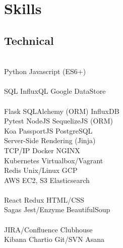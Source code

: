 \documentclass[]{deedy-resume-openfont}
\begin{document}
\begin{minipage}[t]{0.31\textwidth}
\section{Skills}
\subsection{Technical}
\\[1\baselineskip]

Python \textbullet{} Javascript (ES6+) \\
\\[1\baselineskip]

SQL \textbullet{} InfluxQL \textbullet{} Google DataStore \\
\\[1\baselineskip]

Flask \textbullet{} SQLAlchemy (ORM) \textbullet{} InfluxDB \\
Pytest \textbullet{} NodeJS \textbullet{} SequelizeJS (ORM)   \\
Koa \textbullet{} PassportJS \textbullet{} PostgreSQL\\
Server-Side Rendering (Jinja)
\\[1\baselineskip]

TCP/IP \textbullet{} Docker \textbullet{} NGINX \\
Kubernetes \textbullet{} Virtualbox/Vagrant \\
Redis \textbullet{} Unix/Linux \textbullet{} GCP \\
AWS EC2, S3 \textbullet{} Elasticsearch \\
\\[1\baselineskip]

React \textbullet{} Redux \textbullet{} HTML/CSS \\
Sagas \textbullet{} Jest/Enzyme \textbullet{} BeautifulSoup \\
\\[1\baselineskip]

JIRA/Confluence \textbullet{} Clubhouse \\
Kibana \textbullet{} Chartio \textbullet{} Git/SVN \textbullet{} Asana \\
\\[1\baselineskip]

\\[1\baselineskip]


\end{minipage}
\end{document}
